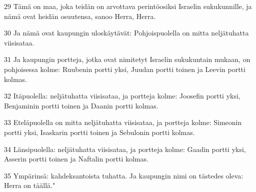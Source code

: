 \par 29 Tämä on maa, joka teidän on arvottava perintöosiksi Israelin sukukunnille, ja nämä ovat heidän osuutensa, sanoo Herra, Herra.
\par 30 Ja nämä ovat kaupungin uloskäytävät: Pohjoispuolella on mitta neljätuhatta viisisataa.
\par 31 Ja kaupungin portteja, jotka ovat nimitetyt Israelin sukukuntain mukaan, on pohjoisessa kolme: Ruubenin portti yksi, Juudan portti toinen ja Leevin portti kolmas.
\par 32 Itäpuolella: neljätuhatta viisisataa, ja portteja kolme: Joosefin portti yksi, Benjaminin portti toinen ja Daanin portti kolmas.
\par 33 Eteläpuolella on mitta neljätuhatta viisisataa, ja portteja kolme: Simeonin portti yksi, Isaskarin portti toinen ja Sebulonin portti kolmas.
\par 34 Länsipuolella: neljätuhatta viisisataa, ja portteja kolme: Gaadin portti yksi, Asserin portti toinen ja Naftalin portti kolmas.
\par 35 Ympärinsä: kahdeksantoista tuhatta. Ja kaupungin nimi on tästedes oleva: Herra on täällä."


